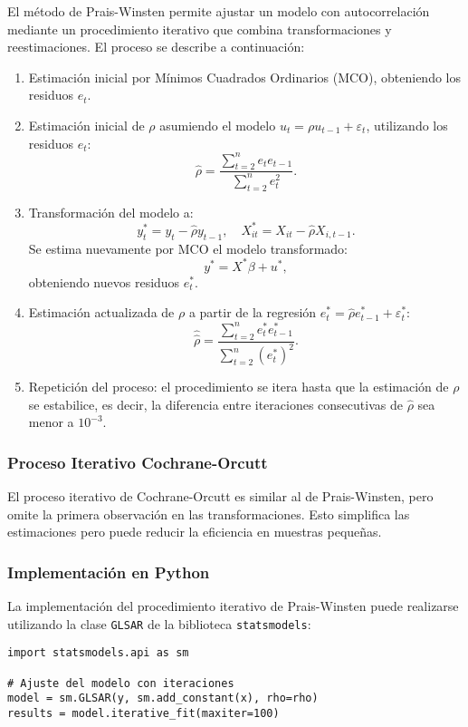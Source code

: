 \documentclass[a4paper,12pt]{article}
\begin{document}
El método de Prais-Winsten permite ajustar un modelo con autocorrelación mediante un procedimiento iterativo que combina transformaciones y reestimaciones. El proceso se describe a continuación:

\begin{enumerate}
    \item Estimación inicial por Mínimos Cuadrados Ordinarios (MCO), obteniendo los residuos $e_t$.
    \item Estimación inicial de $\rho$ asumiendo el modelo $u_t = \rho u_{t-1} + \varepsilon_t$, utilizando los residuos $e_t$:
    \[
    \hat{\rho} = \frac{\sum_{t=2}^n e_t e_{t-1}}{\sum_{t=2}^n e_t^2}.
    \]
    \item Transformación del modelo a:
    \[
    y_t^* = y_t - \hat{\rho} y_{t-1}, \quad X_{it}^* = X_{it} - \hat{\rho} X_{i,t-1}.
    \]
    Se estima nuevamente por MCO el modelo transformado:
    \[
    y^* = X^* \beta + u^*,
    \]
    obteniendo nuevos residuos $e_t^*$.
    \item Estimación actualizada de $\rho$ a partir de la regresión $e_t^* = \hat{\rho} e_{t-1}^* + \varepsilon_t^*$:
    \[
    \hat{\hat{\rho}} = \frac{\sum_{t=2}^n e_t^* e_{t-1}^*}{\sum_{t=2}^n (e_t^*)^2}.
    \]
    \item Repetición del proceso: el procedimiento se itera hasta que la estimación de $\rho$ se estabilice, es decir, la diferencia entre iteraciones consecutivas de $\hat{\rho}$ sea menor a $10^{-3}$.
\end{enumerate}

\subsubsection{Proceso Iterativo Cochrane-Orcutt}

El proceso iterativo de Cochrane-Orcutt es similar al de Prais-Winsten, pero omite la primera observación en las transformaciones. Esto simplifica las estimaciones pero puede reducir la eficiencia en muestras pequeñas.

\subsubsection{Implementación en Python}

La implementación del procedimiento iterativo de Prais-Winsten puede realizarse utilizando la clase \texttt{GLSAR} de la biblioteca \texttt{statsmodels}:

\begin{verbatim}
import statsmodels.api as sm

# Ajuste del modelo con iteraciones
model = sm.GLSAR(y, sm.add_constant(x), rho=rho)
results = model.iterative_fit(maxiter=100)
\end{verbatim}
\end{document}

